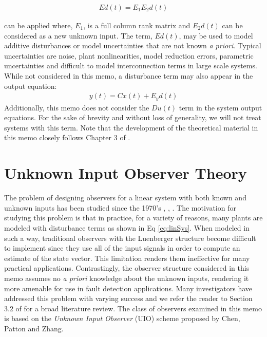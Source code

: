 \documentclass{amsart}
\theoremstyle{definition}
\theoremstyle{remark}
\numberwithin{equation}{section}
\begin{document}
\begin{align*}
Ed(t) = E_1 E_2 d(t)
\end{align*}

can be applied where, $E_1$, is a full column rank matrix and $E_2 d(t)$ can be considered as a new unknown input. The term, $Ed(t)$, may be used to model additive disturbances or model uncertainties that are not known \textit{a priori}. Typical uncertainties are noise, plant nonlinearities, model reduction errors, parametric uncertainties and difficult to model interconnection terms in large scale systems. While not considered in this memo, a disturbance term may also appear in the output equation:
\begin{align*}
y(t) = Cx(t)+E_y d(t)
\end{align*}
Additionally, this memo does not consider the $Du(t)$ term in the system output equations.  For the sake of brevity and without loss of generality, we will not treat systems with this term. Note that the development of the theoretical material in this memo closely follows Chapter 3 of \cite{Chen99}.
\section{Unknown Input Observer Theory}

The problem of designing observers for a linear system with both known and unknown inputs has been studied since the 1970's \cite{Chen99}, \cite{Pat89}, \cite{Shaf2015}.  The motivation for studying this problem is that in practice, for a variety of reasons, many plants are modeled with disturbance terms as shown in Eq \ref{eq:linSys}. When modeled in such a way, traditional observers with the Luenberger structure become difficult to implement since they use all of the input signals in order to compute an estimate of the state vector. This limitation renders them ineffective for many practical applications. Contrastingly, the observer structure considered in this memo assumes no \textit{a priori} knowledge about the unknown inputs, rendering it more amenable for use in fault detection applications. Many investigators have addressed this problem with varying success and we refer the reader to Section 3.2 of \cite{Chen99} for a broad literature review. The class of observers examined in this memo is based on the \textit{Unknown Input Observer} (UIO) scheme proposed by Chen, Patton and Zhang.
\end{document}

